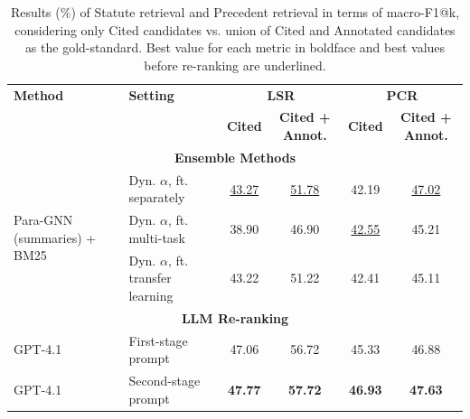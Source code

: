 \begin{table}[!thb]
    \centering
    \small
    \begin{tabular}{p{}p{}cccc}
         \toprule
         \textbf{Method} & \textbf{Setting} & \multicolumn{2}{c}{\textbf{LSR}} & \multicolumn{2}{c}{\textbf{PCR}} \\
          & & \textbf{Cited} & \textbf{Cited + Annot.} & \textbf{Cited} & \textbf{Cited + Annot.} \\ \midrule 
        
         
         \multicolumn{6}{c}{\textbf{Ensemble Methods}}\\ \midrule 
          \multirow{3}{*}{Para-GNN (summaries) + BM25} & Dyn. $\alpha$, ft. separately & \underline{43.27} & \underline{51.78} & 42.19 & \underline{47.02} \\
          & Dyn. $\alpha$, ft. multi-task & 38.90&  46.90&  \underline{42.55}& 45.21\\
          & Dyn. $\alpha$, ft. transfer learning & 43.22&  51.22&  42.41& 45.11\\ \midrule 
          \multicolumn{6}{c}{\textbf{LLM Re-ranking}}\\ \midrule 
          GPT-4.1 & First-stage prompt & 47.06& 56.72& 45.33& 46.88\\
          GPT-4.1 & Second-stage prompt & \textbf{47.77}& \textbf{57.72}& \textbf{46.93}& \textbf{47.63}\\
          \bottomrule
    \end{tabular}
    \vspace{-2mm}
    \caption{Results (\%) of Statute retrieval and Precedent retrieval in terms of macro-F1@k, considering only Cited candidates vs. union of Cited and Annotated candidates as the gold-standard. Best value for each metric in boldface and best values before re-ranking are underlined.}
    \label{tab:human-results}
    \vspace{-5mm}
\end{table}



